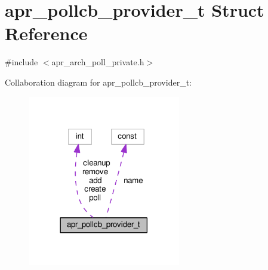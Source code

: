 \hypertarget{structapr__pollcb__provider__t}{}\section{apr\+\_\+pollcb\+\_\+provider\+\_\+t Struct Reference}
\label{structapr__pollcb__provider__t}


{\ttfamily \#include $<$apr\+\_\+arch\+\_\+poll\+\_\+private.\+h$>$}



Collaboration diagram for apr\+\_\+pollcb\+\_\+provider\+\_\+t\+:
\nopagebreak
\begin{figure}[H]
\begin{center}
\leavevmode
\includegraphics[width=189pt]{structapr__pollcb__provider__t__coll__graph}
\end{center}
\end{figure}

